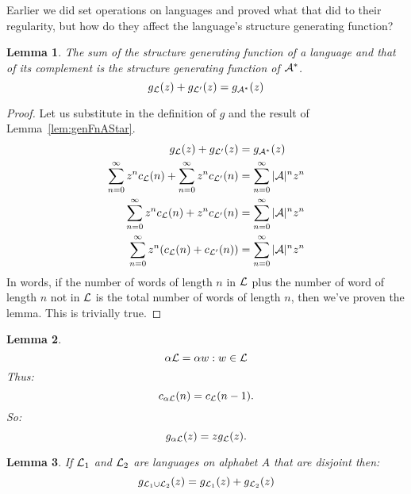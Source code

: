 \documentclass[a4paper]{article}
\newtheorem{lemma}{Lemma}[section]
\theoremstyle{definition}
\theoremstyle{definition}
\theoremstyle{definition}
\begin{document}
Earlier we did set operations on languages and proved what that did to their regularity, but how do they affect the language's structure generating function?

\begin{lemma}
    The sum of the structure generating function of a language and that of its complement is the structure generating function of \(\mathcal{A}^*\).
    \[
    g_{\mathcal{L}}(z) + g_{\mathcal{L}^\prime}(z) = g_{\mathcal{A}^*}(z)
    \]
\end{lemma}
\begin{proof}
    Let us substitute in the definition of \(g\) and the result of Lemma~\ref{lem:genFnAStar}.
    \begin{align*}
        g_{\mathcal{L}}(z) + g_{\mathcal{L}^\prime}(z) &= g_{\mathcal{A}^*}(z) \\
        \sum_{n=0}^\infty z^n c_{\mathcal{L}}(n) + \sum_{n=0}^\infty z^n c_{\mathcal{L}^\prime}(n) &= \sum_{n=0}^\infty |\mathcal{A}|^n z^n \\
        \sum_{n=0}^\infty z^n c_{\mathcal{L}}(n) + z^n c_{\mathcal{L}^\prime}(n) &= \sum_{n=0}^\infty |\mathcal{A}|^n z^n \\
        \sum_{n=0}^\infty z^n (c_{\mathcal{L}}(n) + c_{\mathcal{L}^\prime}(n)) &= \sum_{n=0}^\infty |\mathcal{A}|^n z^n \\
    \end{align*}
    In words, if the number of words of length \(n\) in \(\mathcal{L}\) plus the number of word of length \(n\) not in \(\mathcal{L}\) is the total number of words of length \(n\), then we've proven the lemma. This is trivially true.
    
\end{proof}

\begin{lemma}
    \label{lem:genFnOfPrependedLang}
    \[
    \alpha\mathcal{L} = {\alpha w : w \in \mathcal{L}}
    \]
    Thus:
    \[
    c_{\alpha\aLanguage}(n) = c_\aLanguage(n-1). %
    \]
    So:
    \[
    g_{\alpha\mathcal{L}}(z) = z g_{\mathcal{L}}(z).
    \]
\end{lemma}

\begin{lemma}
    \label{lem:addOfDisjointGenFn}
    If $\mathcal{L}_1$ and $\mathcal{L}_2$ are languages on alphabet $A$ that are disjoint then:
    \[
    g_{\mathcal{L}_1 \cup \mathcal{L}_2}(z) = g_{\mathcal{L}_1}(z) + g_{\mathcal{L}_2}(z)
    \]
\end{lemma}

\end{document}
